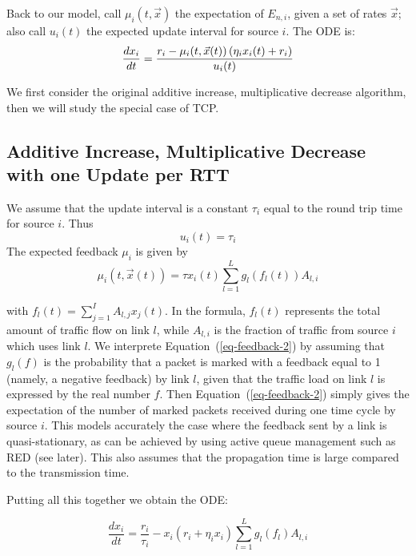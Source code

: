 Back to our model, call $\mu_i(t, \vec{x})$ the expectation of
$E_{n,i}$, given a set of rates $\vec{x}$; also call $u_i(t)$ the
expected update interval for source $i$. The ODE is:
\begin{equation}\mylabel{eq-odedebase}
   \frac{dx_i}{dt}
        =
   \frac{r_i - \mu_i(t, \vec{x}(t) )\left( \eta_i x_i(t) + r_i \right)}{u_i(t)}
\end{equation}

We first consider the original additive increase, multiplicative
decrease algorithm, then we will study the special case of TCP.

\subsection{Additive Increase, Multiplicative Decrease with one Update per RTT}
We assume that the update interval is a constant $\tau_i$ equal to
the round trip time for source $i$. Thus
$$
u_i(t) = \tau_i
$$
The expected feedback $\mu_i$ is given by
\begin{equation}
        \mu_i(t,\vec{x}(t)) = \tau x_{i}(t) \sum_{l=1}^{L} g_{l}(f_{l}(t))
        A_{l,i}
        \label{eq-feedback-2}
\end{equation}

with $f_{l}(t)= \sum_{j=1}^I A_{l,j}x_{j}(t)$.  In the formula,
$f_{l}(t)$ represents the total amount of traffic flow on link
$l$, while $A_{l,i}$ is the fraction of traffic from source $i$
which uses link $l$.  We interprete Equation~(\ref{eq-feedback-2})
by assuming that $g_{l}(f)$ is the probability that a packet is
marked with a feedback equal to 1 (namely, a negative feedback) by
link $l$, given that the traffic load on link $l$ is expressed by
the real number $f$.
Then Equation~(\ref{eq-feedback-2}) simply gives the expectation
of the number of marked packets received during one time cycle by
source $i$. This models accurately the case where the feedback
sent by a link is quasi-stationary, as can be achieved by using
active queue management such as RED (see later). This also assumes
that the propagation time is large compared to the transmission
time.

Putting all this together we obtain the ODE:

 \begin{equation}
        \frac{dx_{i}}{dt}
        =
        \frac{r_i}{\tau_i} -  x_{i} (r_{i}+\eta_i x_{i}) \sum_{l=1}^{L}
        g_{l}(f_{l})A_{l,i}
        \label{eq-ode-cas-A}
  \end{equation}

